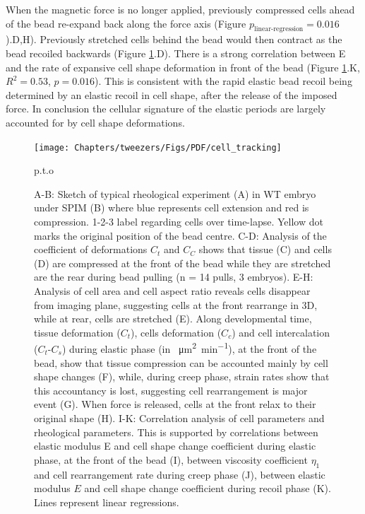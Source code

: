 When the magnetic force is no longer applied, previously compressed cells ahead of the bead re-expand back along the force axis (Figure $p_\text{linear-regression} = 0.016$).D,H).
Previously stretched cells behind the bead would then contract as the bead recoiled backwards (Figure \ref{fig:cell_tracking}.D).
There is a strong correlation between E and the rate of expansive cell shape deformation in front of the bead (Figure \ref{fig:cell_tracking}.K, $R^2 = 0.53$, $p = 0.016$).
This is consistent with the rapid elastic bead recoil being determined by an elastic recoil in cell shape, after the release of the imposed force.
In conclusion the cellular signature of the elastic periods are largely accounted for by cell shape deformations.

\begin{landscape}
  \begin{figure}
    \centering
     \texttt{[image: Chapters/tweezers/Figs/PDF/cell\_tracking]}
     \caption{p.t.o}
      \label{fig:cell_tracking}
  \end{figure}
\end{landscape}
\begin{figure}\ContinuedFloat
  \caption{
  A-B: Sketch of typical rheological experiment (A) in WT embryo under SPIM (B) where blue represents cell extension and red is compression. 1-2-3 label regarding cells over time-lapse.
  Yellow dot marks the original position of the bead centre.
  C-D: Analysis of the coefficient of deformations $C_t$ and $C_C$ shows that tissue (C) and cells (D) are compressed at the front of the bead while they are stretched are the rear during bead pulling (n = 14 pulls, 3 embryos).
  E-H: Analysis of cell area and cell aspect ratio reveals cells disappear from imaging plane, suggesting cells at the front rearrange in 3D, while at rear, cells are stretched (E).
  Along developmental time, tissue deformation ($C_t$), cells deformation ($C_c$) and cell intercalation ($C_t$-$C_s$) during elastic phase (in \SI{}{\micro\metre\squared\per\minute}), at the front of the bead, show that tissue compression can be accounted mainly by cell shape changes (F), while, during creep phase, strain rates show that this accountancy is lost, suggesting cell rearrangement is major event (G).
  When force is released, cells at the front relax to their original shape (H).
  I-K: Correlation analysis of cell parameters and rheological parameters.
  This is supported by correlations between elastic modulus E and cell shape change coefficient during elastic phase, at the front of the bead (I), between viscosity coefficient $\eta_1$ and cell rearrangement rate during creep phase (J), between elastic modulus $E$ and cell shape change coefficient during recoil phase (K).
  Lines represent linear regressions.
  }
\end{figure}
